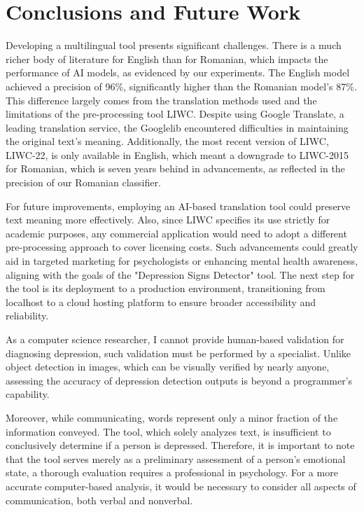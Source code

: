 \chapter{Conclusions and Future Work}
\label{conclusions}

\quad Developing a multilingual tool presents significant challenges. There is a much richer body of literature for English than for Romanian, which impacts the performance of AI models, as evidenced by our experiments. The English model achieved a precision of 96\%, significantly higher than the Romanian model's 87\%. This difference largely comes from the translation methods used and the limitations of the pre-processing tool LIWC. Despite using Google Translate, a leading translation service, the Googlelib \cite{googletranslib} encountered difficulties in maintaining the original text's meaning. Additionally, the most recent version of LIWC, LIWC-22, is only available in English, which meant a downgrade to LIWC-2015 for Romanian, which is seven years behind in advancements, as reflected in the precision of our Romanian classifier.

For future improvements, employing an AI-based translation tool could preserve text meaning more effectively. Also, since LIWC \cite{boyd2022development} specifies its use strictly for academic purposes, any commercial application would need to adopt a different pre-processing approach to cover licensing costs. Such advancements could greatly aid in targeted marketing for psychologists or enhancing mental health awareness, aligning with the goals of the "Depression Signs Detector" tool. The next step for the tool is its deployment to a production environment, transitioning from localhost to a cloud hosting platform to ensure broader accessibility and reliability.

As a computer science researcher, I cannot provide human-based validation for diagnosing depression, such validation must be performed by a specialist. Unlike object detection in images, which can be visually verified by nearly anyone, assessing the accuracy of depression detection outputs is beyond a programmer’s capability.

Moreover, while communicating, words represent only a minor fraction of the information conveyed. The tool, which solely analyzes text, is insufficient to conclusively determine if a person is depressed. Therefore, it is important to note that the tool serves merely as a preliminary assessment of a person’s emotional state, a thorough evaluation requires a professional in psychology. For a more accurate computer-based analysis, it would be necessary to consider all aspects of communication, both verbal and nonverbal.

